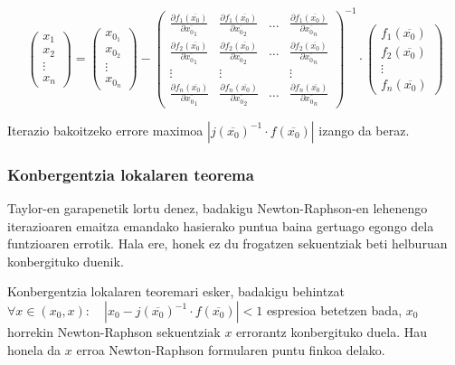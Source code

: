 \documentclass[10pt,a4paper,basque]{article}
\begin{document}
$$
\left(
\begin{array}{c}
x_1\\
x_2\\
\vdots\\
x_n
\end{array}
\right) = 
\left(
\begin{array}{c}
x_{0_1}\\
x_{0_2}\\
\vdots\\
x_{0_n}
\end{array}
\right) -
\left(
\begin{array}{cccc}
\frac{\partial f_{1}(\overline{x_0})}{\partial \overline{{x_0}_1}} & \frac{\partial f_{1}(\overline{x_0})}{\partial \overline{{x_0}_2}} & \ldots & \frac{\partial f_{1}(\overline{x_0})}{\partial \overline{{x_0}_n}}\\
\frac{\partial f_{2}(\overline{x_0})}{\partial \overline{{x_0}_1}} & \frac{\partial f_{2}(\overline{x_0})}{\partial \overline{{x_0}_2}} & \ldots & \frac{\partial f_{2}(\overline{x_0})}{\partial \overline{{x_0}_n}}\\
\vdots & \vdots &  & \vdots\\
\frac{\partial f_{n}(\overline{x_0})}{\partial \overline{{x_0}_1}} & \frac{\partial f_{n}(\overline{x_0})}{\partial \overline{{x_0}_2}} & \ldots & \frac{\partial f_{n}(\overline{x_0})}{\partial \overline{{x_0}_n}}
\end{array}
\right)^{-1} \cdot
\left(
\begin{array}{c}
f_{1}(\overline{x_0})\\
f_{2}(\overline{x_0})\\
\vdots\\
f_{n}(\overline{x_0})
\end{array}
\right)
$$

Iterazio bakoitzeko errore maximoa $|j(\overline{x_0})^{-1} \cdot f(\overline{x_0})|$ izango da beraz.

\subsubsection{Konbergentzia lokalaren teorema}

Taylor-en garapenetik lortu denez, badakigu Newton-Raphson-en lehenengo iterazioaren emaitza emandako hasierako puntua baina gertuago egongo dela funtzioaren errotik. Hala ere, honek ez du frogatzen sekuentziak beti helburuan konbergituko duenik.

Konbergentzia lokalaren teoremari esker, badakigu behintzat $\forall x \in (x_0, x): \quad |x_0 - j(\overline{x_0})^{-1} \cdot f(\overline{x_0})| < 1$ espresioa betetzen bada, $x_0$ horrekin Newton-Raphson sekuentziak $x$ errorantz konbergituko duela. Hau honela da $x$ erroa Newton-Raphson formularen puntu finkoa delako.
\end{document}
